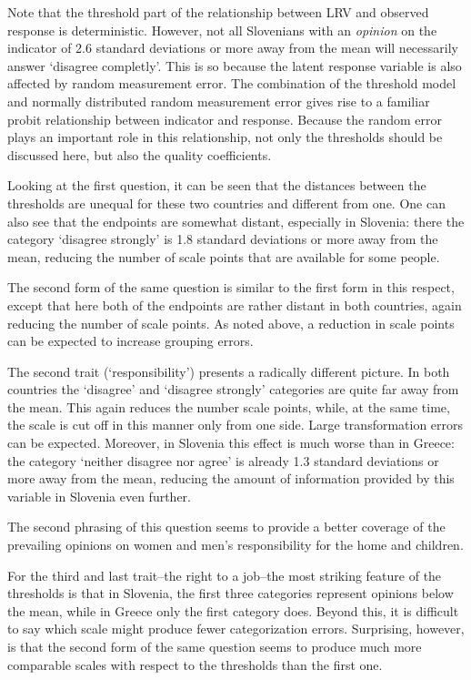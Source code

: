 \documentclass[a4paper,12pt]{article}
\begin{document}
Note that the threshold part of the relationship between LRV and observed response is deterministic. However, not all Slovenians with an \emph{opinion} on the indicator of 2.6 standard deviations or more away from the mean will necessarily answer `disagree completly'.  This is so because the latent response variable is also affected by random measurement error. The combination of the threshold model and normally distributed random measurement error gives rise to a familiar probit relationship between indicator and response. Because the random error plays an important role in this relationship, not only the thresholds should be discussed here, but also the quality coefficients. 

Looking at the first question, it can be seen that the distances between the thresholds are unequal for these two countries and different from one. One can also see that the endpoints are somewhat distant, especially in Slovenia: there the category `disagree strongly' is 1.8 standard deviations or more away from the mean, reducing the number of scale points that are available for some people. 

The second form of the same question is similar to the first form in this respect, except that here both of the endpoints are rather distant in both countries, again reducing the number of scale points. As noted above, a reduction in scale points can be expected to increase grouping errors.

The second trait (`responsibility') presents a radically different picture. In both countries the `disagree' and `disagree strongly' categories are quite far away from the mean. This again reduces the number scale points, while, at the same time, the scale is cut off in this manner only from one side. Large transformation errors can be expected. Moreover, in Slovenia this effect is much worse than in Greece: the category `neither disagree nor agree' is already 1.3 standard deviations or more away from the mean,  reducing the amount of information provided by this variable in Slovenia even further.

The second phrasing of this question seems to provide a better coverage of the prevailing opinions on women and men's responsibility for the home and children.

For the third and last trait--the right to a job--the most striking feature of the thresholds is that in Slovenia, the first three categories represent opinions below the mean, while in Greece only the first category does. Beyond this, it is difficult to say which scale might produce fewer categorization errors. Surprising, however, is that the second form of the same question seems to produce much more comparable scales with respect to the thresholds than the first one.
\end{document}
